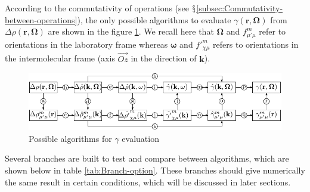 According to the commutativity of operations (see $\mathsection$\ref{subsec:Commutativity-between-operations}),
the only possible algorithms to evaluate $\gamma(\mathbf{r},\mathbf{\Omega})$
from $\Delta\rho(\mathbf{r},\mathbf{\Omega})$ are shown in the figure
\ref{fig:Possible-algorithms}. We recall here that $\mathbf{\Omega}$
and $f_{\mu'\mu}^{m}$ refer to orientations in the laboratory frame
whereas $\boldsymbol{\omega}$ and ${f'}_{\chi\mu}^{m}$ refers to
orientations in the intermolecular frame (axis $\overrightarrow{Oz}$
in the direction of $\mathbf{k}$).

\begin{figure}[h]
\begin{centering}
\includegraphics{_figure/algorithms}
\par\end{centering}
\caption{Possible algorithms for $\gamma$ evaluation\label{fig:Possible-algorithms}}
\end{figure}

Several branches are built to test and compare between algorithms,
which are shown below in table \ref{tab:Branch-option}. These branches
should give numerically the same result in certain conditions, which
will be discussed in later sections. 

